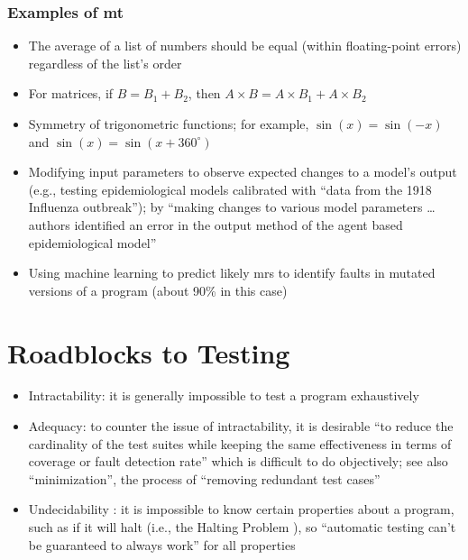 \subsubsection{Examples of \acs{mt}}
\begin{itemize}
      \item The average of a list of numbers should be equal (within
            floating-point errors) regardless of the list's order
            \citep[p.~67]{KanewalaAndYuehChen2019}
      \item For matrices, if $B = B_1 + B_2$, then $A \times B = A \times B_1
                  + A \times B_2$ \citep[pp.~68-69]{KanewalaAndYuehChen2019}
      \item Symmetry of trigonometric functions; for example, $\sin(x) = \sin(-x)$
            and $\sin(x) = \sin(x + 360^{\circ})$ \citep[p.~70]{KanewalaAndYuehChen2019}
      \item Modifying input parameters to observe expected changes to a model's
            output (e.g., testing epidemiological models calibrated with
            ``data from the 1918 Influenza outbreak''); by ``making changes to
            various model parameters \dots authors identified an error in the
            output method of the agent based epidemiological model''
            \citep[p.~70]{KanewalaAndYuehChen2019}
      \item Using machine learning to predict likely \acsp{mr} to identify
            faults in mutated versions of a program (about 90\% in this case)
            \citep[p.~71]{KanewalaAndYuehChen2019}
\end{itemize}

\section{Roadblocks to Testing}

\begin{itemize}
      \item Intractability: it is generally impossible to test a program
            exhaustively \exhInfCite{}
      \item Adequacy: to counter the issue of intractability, it is desirable
            ``to reduce the cardinality of the test suites while keeping the
            same effectiveness in terms of coverage or fault detection rate''
            \citep[p.~5-4]{SWEBOK2024} which is difficult to do objectively;
            see also ``minimization'', the process of ``removing redundant test
            cases'' \citep[p.~5-4]{SWEBOK2024}
      \item Undecidability \citep[p.~439]{PetersAndPedrycz2000}: it is
            impossible to know certain properties about a program, such as if
            it will halt (i.e., the Halting Problem
            \citep[p.~4]{gurfinkel_testing_2017}), so ``automatic testing
            can't be guaranteed to always work'' for all properties
            \citep{nelson_formal_1999} 
\end{itemize}

